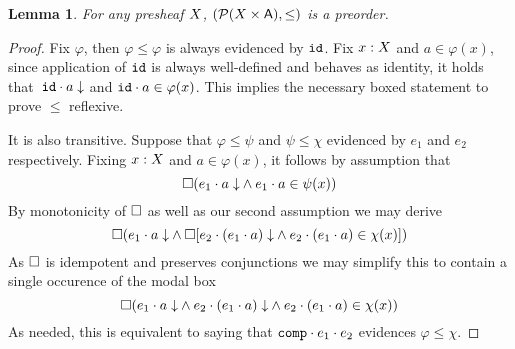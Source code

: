 \documentclass[11pt]{article}
\newtheorem{lemm}[thrm]{Lemma}
\begin{document}
\begin{lemm}\label{lemm:tripos-preorder}
  For any presheaf \(X\), \((\mathcal{P}{({X}\times{\ensuremath{\mathsf{A}}})}, \leq)\) is a preorder.
\end{lemm}
\begin{proof}
  Fix \(\varphi\), then \(\varphi \leq \varphi\) is always evidenced by
  \(\texttt{id}\).
  Fix \(x : X\) and \(a \in \varphi(x)\), since application of \(\texttt{id}\) is
  always well-defined and behaves as identity, it holds
  that~\({{\texttt{id}}\cdot{a}}\downarrow\) and \({{\texttt{id}}\cdot{a}\in\varphi(x)}\).
  This implies the necessary boxed statement to prove \(\leq\) reflexive.

  It is also transitive. Suppose that \(\varphi \leq \psi\) and
  \(\psi \leq \chi\) evidenced by \(e_{1}\) and \(e_{2}\) respectively.
  Fixing \(x : X\) and \(a \in \varphi(x)\), it follows by assumption that
  \[
    \IBox{(
      \IAnd%
      {\ITotal{\IAp{e_{1}}{a}}}%
      {\IAp{e_{1}}{a} \in \psi(x)}
    )}
  \]
  By monotonicity of \(\Box\) as well as our second assumption we may derive
  \[
    \IBox{(
      \IAnd%
      {\ITotal{\IAp{e_{1}}{a}}}%
      {\IBox{[\IAnd%
        {\ITotal{\IAp{e_{2}}{(\IAp{e_{1}}{a})}}}%
        {\IAp{e_{2}}{(\IAp{e_{1}}{a})} \in \chi(x)}
      ]}}
    )}
  \]
  As \(\Box\) is idempotent and preserves conjunctions we may simplify this
  to contain a single occurence of the modal box
  \[
    \IBox{(
      \IAnd%
      {\ITotal{\IAp{e_{1}}{a}}}%
      {\IAnd%
        {\ITotal{\IAp{e_{2}}{(\IAp{e_{1}}{a})}}}%
        {\IAp{e_{2}}{(\IAp{e_{1}}{a})} \in \chi(x)}
      }
    )}
  \]
  As needed, this is equivalent to saying that
  \({{\texttt{comp}}\cdot{e_{1}}}\cdot{e_{2}}\) evidences \(\varphi \leq \chi\).
\end{proof}
\end{document}
